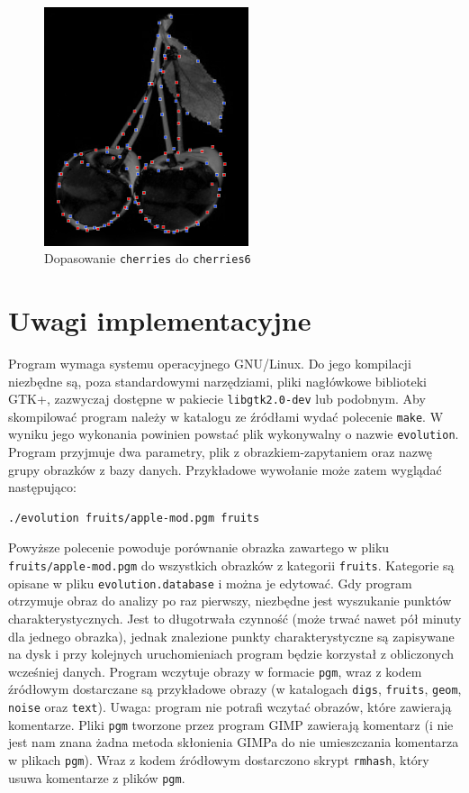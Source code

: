 \documentclass[a4paper,12pt,leqno]{article}
\begin{document}
\begin{figure}\centering
\includegraphics[width=6cm,keepaspectratio=true]{./cherries-match.png}
\caption{Dopasowanie \texttt{cherries} do \texttt{cherries6}}
\end{figure}

\section{Uwagi implementacyjne}

Program wymaga systemu operacyjnego GNU/Linux. Do jego kompilacji niezbędne są, poza standardowymi narzędziami, pliki nagłówkowe biblioteki GTK+,
zazwyczaj dostępne w pakiecie \texttt{libgtk2.0-dev} lub podobnym. Aby skompilować program należy w katalogu ze źródłami wydać polecenie \texttt{make}.
W wyniku jego wykonania powinien powstać plik wykonywalny o nazwie \texttt{evolution}. Program przyjmuje dwa parametry, plik z obrazkiem-zapytaniem oraz
nazwę grupy obrazków z bazy danych. Przykładowe wywołanie może zatem wyglądać następująco:
\begin{verbatim}./evolution fruits/apple-mod.pgm fruits\end{verbatim}
Powyższe polecenie powoduje porównanie obrazka zawartego w pliku \texttt{fruits/apple-mod.pgm} do wszystkich obrazków z kategorii \texttt{fruits}.
Kategorie są opisane w pliku \texttt{evolution.database} i można je edytować. Gdy program otrzymuje obraz do analizy po raz pierwszy, niezbędne jest
wyszukanie punktów charakterystycznych. Jest to długotrwała czynność (może trwać nawet pół minuty dla jednego obrazka), jednak znalezione punkty
charakterystyczne są zapisywane na dysk i przy kolejnych uruchomieniach program będzie korzystał z obliczonych wcześniej danych. Program wczytuje
obrazy w formacie \texttt{pgm}, wraz z kodem źródłowym dostarczane są przykładowe obrazy (w katalogach \texttt{digs}, \texttt{fruits}, \texttt{geom},
\texttt{noise} oraz \texttt{text}). Uwaga: program nie potrafi wczytać obrazów, które zawierają komentarze. Pliki \texttt{pgm} tworzone przez program
GIMP zawierają komentarz (i nie jest nam znana żadna metoda skłonienia GIMPa do nie umieszczania komentarza w plikach \texttt{pgm}). Wraz z kodem
źródłowym dostarczono skrypt \texttt{rmhash}, który usuwa komentarze z plików \texttt{pgm}.
\end{document}
